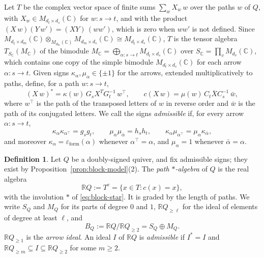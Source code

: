 \documentclass[12pt, a4paper]{report}
\theoremstyle{plain}
\theoremstyle{definition}
\newtheorem{definition}[theorem]{Definition}
\theoremstyle{remark}
\theoremstyle{plain}
\newcommand{\epsilonform}{\varepsilon_{\mathrm{form}}}
\newcommand{\RR}{\mathbb{R}}
\newcommand{\CC}{\mathbb{C}}
\begin{document}
Let $T$ be the complex vector space of finite sums $\sum_wX_w\,w$ over the paths $w$ of $Q$, with $X_w\in M_{d_t\times d_s}(\CC)$ for $w:s\to t$, and with the product $(X\,w)(Y\,w')=(XY)\,(ww')$, which is zero when $ww'$ is not defined. Since $M_{d_t\times d_m}(\CC)\otimes_{M_{d_m}(\CC)}M_{d_m\times d_s}(\CC)\cong M_{d_t\times d_s}(\CC)$, $T$ is the tensor algebra $T_{S_\CC}(M_\CC)$ of the bimodule $M_\CC=\bigoplus_{\alpha:s\to t}M_{d_t\times d_s}(\CC)$ over $S_\CC=\prod_vM_{d_v}(\CC)$, which contains one copy of the simple bimodule $M_{d_t\times d_s}(\CC)$ for each arrow $\alpha:s\to t$. Given signs $\kappa_\alpha,\mu_\alpha\in\{\pm1\}$ for the arrows, extended multiplicatively to paths, define, for a path $w:s\to t$,
\begin{equation}\label{eq:block-star}
(X\,w)^*=\kappa(w)\,G_sX^TG_t^{-1}\,w^{\top},\qquad c(X\,w)=\mu(w)\,C_t\overline XC_s^{-1}\,\bar w ,
\end{equation}
where $w^{\top}$ is the path of the transposed letters of $w$ in reverse order and $\bar w$ is the path of its conjugated letters. We call the signs \emph{admissible} if, for every arrow $\alpha:s\to t$,
\begin{equation}\label{eq:sign-conditions}
\kappa_\alpha\kappa_{\alpha^{\top}}=g_sg_t,\qquad \mu_\alpha\mu_{\bar\alpha}=h_sh_t,\qquad \kappa_\alpha\mu_{\alpha^{\top}}=\mu_\alpha\kappa_{\bar\alpha},
\end{equation}
and moreover $\kappa_\alpha=\epsilonform(\alpha)$ whenever $\alpha^{\top}=\alpha$, and $\mu_\alpha=1$ whenever $\bar\alpha=\alpha$.

\begin{definition}\label{def:path-star-algebra}
Let $Q$ be a doubly-signed quiver, and fix admissible signs; they exist by Proposition~\ref{prop:block-model}(2). The \emph{path $*$-algebra} of $Q$ is the real algebra
\[ \RR Q:=T^c=\{x\in T:c(x)=x\}, \]
with the involution $*$ of \eqref{eq:block-star}. It is graded by the length of paths. We write $S_Q$ and $M_Q$ for its parts of degree $0$ and $1$, $\RR Q_{\geq\ell}$ for the ideal of elements of degree at least $\ell$, and
\[ B_Q:=\RR Q/\RR Q_{\geq2}=S_Q\oplus M_Q . \]
$\RR Q_{\geq1}$ is the \emph{arrow ideal}. An ideal $I$ of $\RR Q$ is \emph{admissible} if $I^*=I$ and $\RR Q_{\geq m}\subseteq I\subseteq\RR Q_{\geq2}$ for some $m\geq2$.
\end{definition}
\end{document}

